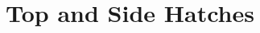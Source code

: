 \documentclass[../main]{subfiles}
\begin{document}
\chapter{Top and Side Hatches} \label{chp:}




\end{document}
